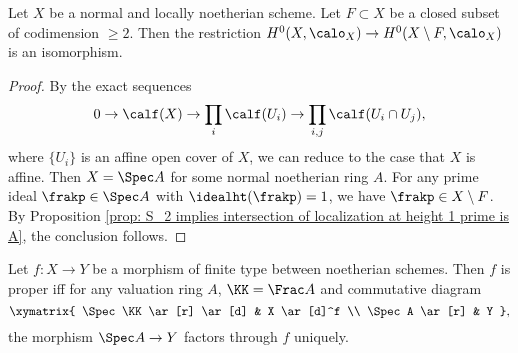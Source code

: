 
    \begin{theorem}\label{thm: extension of function on normal scheme}
        Let $X$ be a normal and locally noetherian scheme.
        Let $F \subset X$ be a closed subset of codimension $\geq 2$.
        Then the restriction $H^0(X,\calo_X) \to H^0(X\setminus F, \calo_{X})$ is an isomorphism.
    \end{theorem}
    \begin{proof}
        By the exact sequences 
        \[ 0 \to \calf(X) \to \prod_i \calf(U_i) \to \prod_{i,j} \calf(U_i \cap U_j), \]
        where $\{U_i\}$ is an affine open cover of $X$, we can reduce to the case that $X$ is affine.
        Then $X = \Spec A$ for some normal noetherian ring $A$.
        For any prime ideal $\frakp \in \Spec A$ with $\idealht(\frakp) = 1$, we have $\frakp \in X \setminus F$.
        By Proposition \ref{prop: S_2 implies intersection of localization at height 1 prime is A}, the conclusion follows.
    \end{proof}

    \begin{theorem}\label{thm: valuation criterion for properness}
        Let $f:X \to Y$ be a morphism of finite type between noetherian schemes.
        Then $f$ is proper iff for any valuation ring $A$, $\KK = \Frac A$ and commutative diagram
        \[ \xymatrix{
            \Spec \KK \ar[r] \ar[d] & X \ar[d]^f \\
            \Spec A \ar[r] & Y
        }, \]
        the morphism $\Spec A \to Y$ factors through $f$ uniquely.
    \end{theorem}


